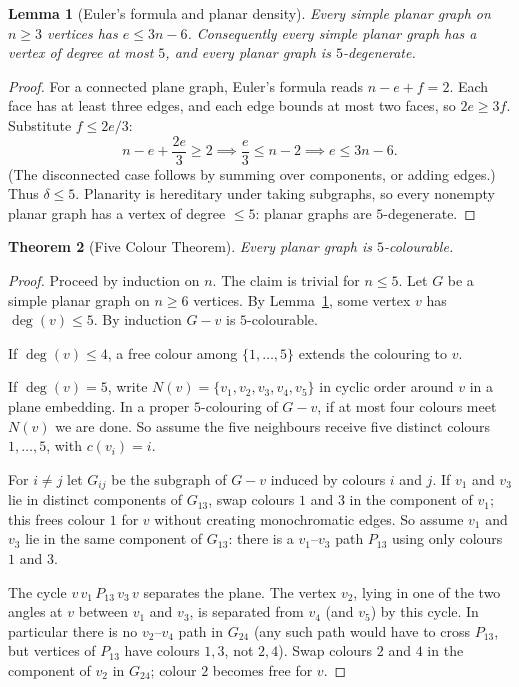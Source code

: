 \documentclass[11pt]{article}
\newtheorem{theorem}{Theorem}[section]
\newtheorem{lemma}[theorem]{Lemma}
\theoremstyle{definition}
\begin{document}
\begin{lemma}[Euler's formula and planar density]\label{lem:planar-dense}
Every simple planar graph on \(n\ge 3\) vertices has \(e\le 3n-6\). Consequently
every simple planar graph has a vertex of degree at most \(5\), and every planar
graph is \(5\)-degenerate.
\end{lemma}

\begin{proof}
For a connected plane graph, Euler's formula reads \(n-e+f=2\). Each face has at
least three edges, and each edge bounds at most two faces, so \(2e\ge 3f\).
Substitute \(f\le 2e/3\):
\[
n-e+\frac{2e}{3}\ge 2\implies \frac{e}{3}\le n-2\implies e\le 3n-6.
\]
(The disconnected case follows by summing over components, or adding edges.)
Thus \(\delta\le 5\). Planarity is hereditary under taking subgraphs, so every
nonempty planar graph has a vertex of degree \(\le 5\): planar graphs are
\(5\)-degenerate.
\end{proof}

\begin{theorem}[Five Colour Theorem]\label{thm:5ct}
Every planar graph is \(5\)-colourable.
\end{theorem}

\begin{proof}
Proceed by induction on \(n\). The claim is trivial for \(n\le 5\). Let \(G\) be
a simple planar graph on \(n\ge 6\) vertices. By Lemma~\ref{lem:planar-dense},
some vertex \(v\) has \(\deg(v)\le 5\). By induction \(G-v\) is \(5\)-colourable.

If \(\deg(v)\le 4\), a free colour among \(\{1,\dots,5\}\) extends the colouring
to \(v\).

If \(\deg(v)=5\), write \(N(v)=\{v_1,v_2,v_3,v_4,v_5\}\) in cyclic order around
\(v\) in a plane embedding. In a proper \(5\)-colouring of \(G-v\), if at most
four colours meet \(N(v)\) we are done. So assume the five neighbours receive
five distinct colours \(1,\dots,5\), with \(c(v_i)=i\).

For \(i\neq j\) let \(G_{ij}\) be the subgraph of \(G-v\) induced by colours
\(i\) and \(j\). If \(v_1\) and \(v_3\) lie in distinct components of \(G_{13}\),
swap colours \(1\) and \(3\) in the component of \(v_1\); this frees colour \(1\)
for \(v\) without creating monochromatic edges. So assume \(v_1\) and \(v_3\)
lie in the same component of \(G_{13}\): there is a \(v_1\)--\(v_3\) path \(P_{13}\)
using only colours \(1\) and \(3\).

The cycle \(v\,v_1\,P_{13}\,v_3\,v\) separates the plane. The vertex \(v_2\), lying
in one of the two angles at \(v\) between \(v_1\) and \(v_3\), is separated from
\(v_4\) (and \(v_5\)) by this cycle. In particular there is no \(v_2\)--\(v_4\)
path in \(G_{24}\) (any such path would have to cross \(P_{13}\), but vertices of
\(P_{13}\) have colours \(1,3\), not \(2,4\)). Swap colours \(2\) and \(4\) in the
component of \(v_2\) in \(G_{24}\); colour \(2\) becomes free for \(v\).
\end{proof}
\end{document}

